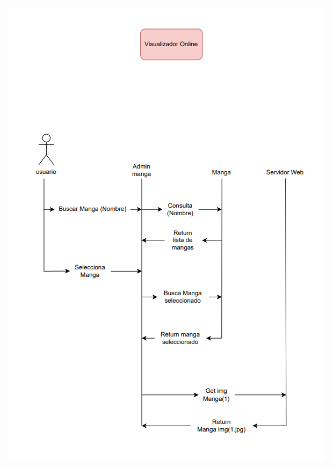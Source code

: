 \documentclass[12pt]{article}
\begin{document}
\begin{figure}[htbp]
	\centering
		\includegraphics[width=0.75\textwidth]{Screenshot 2023-10-05 114415.png}
	\label{fig:Screenshot 2023-10-05 114415}
\end{figure}
\end{document}
